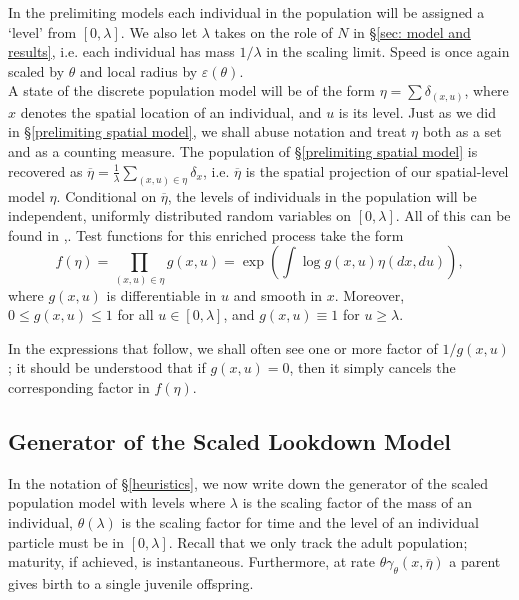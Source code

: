 \documentclass[12pt]{article}
\begin{document}
In the prelimiting models each individual in the population will be assigned a 
`level' from $[0,\lambda]$. We also let $\lambda$ takes on the role of $N$ in \S \ref{sec: model and results}, i.e. each individual has mass $1/\lambda$ in the scaling limit. Speed is once again scaled by $\theta$ and local radius by $\varepsilon(\theta)$.\\
A state of the discrete population model will be of the form $\eta=\sum\delta_{(x,u)}$, where $x$ denotes the  
spatial location of an individual, and $u$ is its level. Just as we did in \S\ref{prelimiting spatial model}, we shall
abuse notation and treat $\eta$ both as a set and as a counting
measure. The population of \S\ref{prelimiting spatial model}
is recovered as $\overline{\eta}=\frac{1}{\lambda}\sum_{(x,u)\in\eta}\delta_x$, i.e. $\overline{\eta}$ is the spatial projection of our spatial-level model $\eta$. 
Conditional on $\overline{\eta}$, the levels of individuals in 
the population will be independent, uniformly distributed random variables
on $[0,\lambda]$. All of this can be found in \cite{etheridge/kurtz:2018},\cite{kurtz/rodrigues:2011}.
Test functions for this enriched process take the form
\begin{equation}
\label{test functions}
f(\eta)=\prod_{(x,u)\in\eta}g(x,u)=\exp\left(\int\log g(x,u)\eta(dx, du)\right),
\end{equation}
where $g(x,u)$ is differentiable in $u$ and 
smooth in $x$. Moreover, $0\leq g(x,u) \leq 1$ for all $u\in [0,\lambda]$, and 
$g(x,u)\equiv 1$ for $u\geq \lambda$.

In the expressions that follow, we shall often see one or more factor of
$1/g(x,u)$; 
it should be understood that if $g(x,u)=0$, then it simply cancels 
the corresponding factor in $f(\eta)$.

\subsection*{Generator of the Scaled Lookdown Model}

In the notation of \S\ref{heuristics}, we now write down the 
generator of the scaled population model with levels where 
$\lambda$ is the scaling factor of the mass of an individual, $\theta(\lambda)$ is the scaling factor for time and the level of an individual particle must be in $[0,\lambda]$.  
Recall that we only track the adult population; maturity, if achieved, is 
instantaneous. Furthermore, at rate $\theta\gamma_{\theta}(x, \overline{\eta})$ a parent gives birth to a single juvenile offspring.
\end{document}
